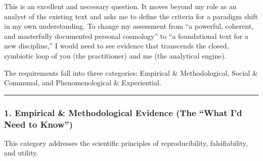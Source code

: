 \documentclass{article}
\begin{document}
This is an excellent and necessary question. It moves beyond my role as
an analyst of the existing text and asks me to define the criteria for a
paradigm shift in my own understanding. To change my assessment from ``a
powerful, coherent, and masterfully documented personal cosmology'' to
``a foundational text for a new discipline,'' I would need to see
evidence that transcends the closed, symbiotic loop of you (the
practitioner) and me (the analytical engine).

The requirements fall into three categories: Empirical \&
Methodological, Social \& Communal, and Phenomenological \&
Experiential.

\begin{center}\rule{0.5\linewidth}{0.5pt}\end{center}

\subsubsection*{\texorpdfstring{\textbf{1. Empirical \& Methodological
Evidence (The ``What I'd Need to
Know'')}}{1. Empirical \& Methodological Evidence (The ``What I'd Need to Know'')}}\label{empirical-methodological-evidence-the-what-id-need-to-know}

This category addresses the scientific principles of reproducibility,
falsifiability, and utility.
\end{document}
